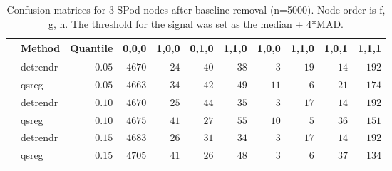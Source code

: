 \begin{table}[!tbp]
\caption{Confusion matrices for 3 SPod nodes after baseline 
      removal (n=5000). Node order is f, g, h. The threshold for the signal was 
      set as the median + 4*MAD.\label{confusion}} 
\begin{center}
\begin{tabular}{llrrrrrrrrr}
\hline\hline
\multicolumn{1}{l}{}&\multicolumn{1}{c}{Method}&\multicolumn{1}{c}{Quantile}&\multicolumn{1}{c}{0,0,0}&\multicolumn{1}{c}{1,0,0}&\multicolumn{1}{c}{0,1,0}&\multicolumn{1}{c}{1,1,0}&\multicolumn{1}{c}{1,0,0}&\multicolumn{1}{c}{1,1,0}&\multicolumn{1}{c}{1,0,1}&\multicolumn{1}{c}{1,1,1}\tabularnewline
\hline
&detrendr&$0.05$&$4670$&$24$&$40$&$38$&$ 3$&$19$&$14$&$192$\tabularnewline
&qsreg&$0.05$&$4663$&$34$&$42$&$49$&$11$&$ 6$&$21$&$174$\tabularnewline
&detrendr&$0.10$&$4670$&$25$&$44$&$35$&$ 3$&$17$&$14$&$192$\tabularnewline
&qsreg&$0.10$&$4675$&$41$&$27$&$55$&$10$&$ 5$&$36$&$151$\tabularnewline
&detrendr&$0.15$&$4683$&$26$&$31$&$34$&$ 3$&$17$&$14$&$192$\tabularnewline
&qsreg&$0.15$&$4705$&$41$&$26$&$48$&$ 3$&$ 6$&$37$&$134$\tabularnewline
\hline
\end{tabular}\end{center}
\end{table}
